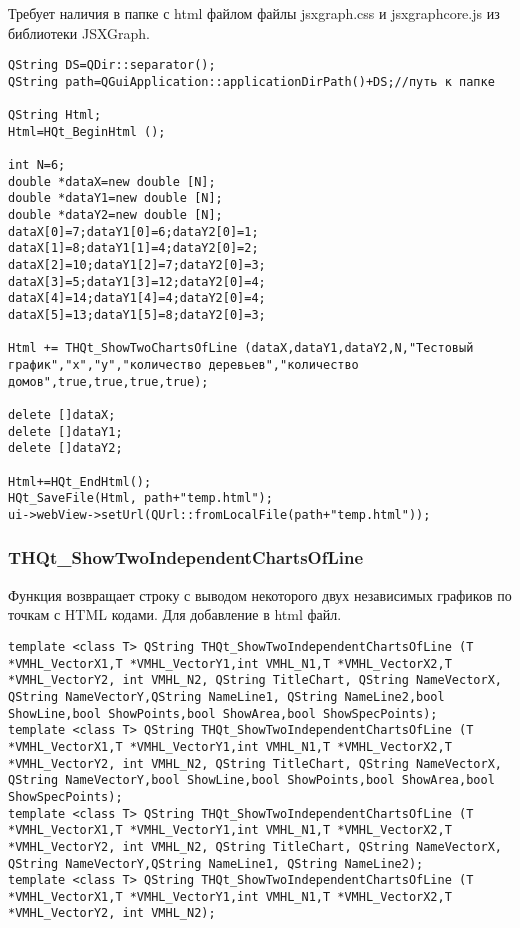\documentclass[a4paper,12pt]{article}
\begin{document}
Требует наличия в папке с html файлом файлы jsxgraph.css и jsxgraphcore.js из библиотеки JSXGraph.


\begin{lstlisting}[label=code_use_THQt_ShowTwoChartsOfLine,caption=Пример использования]
QString DS=QDir::separator();
QString path=QGuiApplication::applicationDirPath()+DS;//путь к папке

QString Html;
Html=HQt_BeginHtml ();

int N=6;
double *dataX=new double [N];
double *dataY1=new double [N];
double *dataY2=new double [N];
dataX[0]=7;dataY1[0]=6;dataY2[0]=1;
dataX[1]=8;dataY1[1]=4;dataY2[0]=2;
dataX[2]=10;dataY1[2]=7;dataY2[0]=3;
dataX[3]=5;dataY1[3]=12;dataY2[0]=4;
dataX[4]=14;dataY1[4]=4;dataY2[0]=4;
dataX[5]=13;dataY1[5]=8;dataY2[0]=3;

Html += THQt_ShowTwoChartsOfLine (dataX,dataY1,dataY2,N,"Тестовый график","x","y","количество деревьев","количество домов",true,true,true,true);

delete []dataX;
delete []dataY1;
delete []dataY2;

Html+=HQt_EndHtml();
HQt_SaveFile(Html, path+"temp.html");
ui->webView->setUrl(QUrl::fromLocalFile(path+"temp.html"));
\end{lstlisting}

\subsubsection{THQt\_ShowTwoIndependentChartsOfLine}\label{THQt_ShowTwoIndependentChartsOfLine}

Функция возвращает строку с выводом некоторого двух независимых графиков по точкам с HTML кодами. Для добавление в html файл.


\begin{lstlisting}[label=code_syntax_THQt_ShowTwoIndependentChartsOfLine,caption=Синтаксис]
template <class T> QString THQt_ShowTwoIndependentChartsOfLine (T *VMHL_VectorX1,T *VMHL_VectorY1,int VMHL_N1,T *VMHL_VectorX2,T *VMHL_VectorY2, int VMHL_N2, QString TitleChart, QString NameVectorX, QString NameVectorY,QString NameLine1, QString NameLine2,bool ShowLine,bool ShowPoints,bool ShowArea,bool ShowSpecPoints);
template <class T> QString THQt_ShowTwoIndependentChartsOfLine (T *VMHL_VectorX1,T *VMHL_VectorY1,int VMHL_N1,T *VMHL_VectorX2,T *VMHL_VectorY2, int VMHL_N2, QString TitleChart, QString NameVectorX, QString NameVectorY,bool ShowLine,bool ShowPoints,bool ShowArea,bool ShowSpecPoints);
template <class T> QString THQt_ShowTwoIndependentChartsOfLine (T *VMHL_VectorX1,T *VMHL_VectorY1,int VMHL_N1,T *VMHL_VectorX2,T *VMHL_VectorY2, int VMHL_N2, QString TitleChart, QString NameVectorX, QString NameVectorY,QString NameLine1, QString NameLine2);
template <class T> QString THQt_ShowTwoIndependentChartsOfLine (T *VMHL_VectorX1,T *VMHL_VectorY1,int VMHL_N1,T *VMHL_VectorX2,T *VMHL_VectorY2, int VMHL_N2);
\end{lstlisting}
\end{document}

